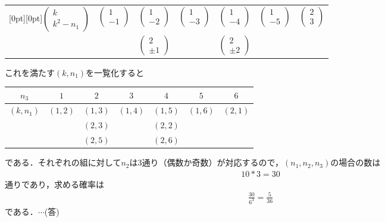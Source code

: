\documentclass[a4paper,10pt]{ltjsarticle}
\begin{document}
\begin{multicols}{2}
\begin{table}[H]
\begin{tabular}{|c||c|c|c|c|c|c|}
      \raisebox{-1.5ex}[0pt][0pt]{$\begin{pmatrix} k \\ k^2-n_1 \end{pmatrix}$} & $\begin{pmatrix} 1 \\ -1 \end{pmatrix}$ & $\begin{pmatrix} 1 \\ -2 \end{pmatrix}$    & $\begin{pmatrix} 1 \\ -3 \end{pmatrix}$ & $\begin{pmatrix} 1 \\ -4 \end{pmatrix}$    & $\begin{pmatrix} 1 \\ -5 \end{pmatrix}$ & $\begin{pmatrix} 2 \\  3 \end{pmatrix}$ \\
                                                                                &                                         & $\begin{pmatrix} 2 \\ \pm 1 \end{pmatrix}$ &                                         & $\begin{pmatrix} 2 \\ \pm 2 \end{pmatrix}$ &                                         &                                         \\
      \hline
    \end{tabular}
  \end{table}
  これを満たす$(k,n_1)$を一覧化すると
  \begin{table}[H]
    \begin{tabular}{|c||c|c|c|c|c|c|}
      \hline
      $n_3$      & $1$     & $2$     & $3$     & $4$     & $5$     & $6$     \\
      \hline
      $(k, n_1)$ & $(1,2)$ & $(1,3)$ & $(1,4)$ & $(1,5)$ & $(1,6)$ & $(2,1)$ \\
                 &         & $(2,3)$ &         & $(2,2)$ &         &         \\
                 &         & $(2,5)$ &         & $(2,6)$ &         &         \\
      \hline
    \end{tabular}
  \end{table}
  である．それぞれの組に対して$n_2$は3通り（偶数か奇数）が対応するので，$(n_1,n_2,n_3)$の場合の数は
  \begin{align*}
    10*3 = 30
  \end{align*}
  通りであり，求める確率は
  \begin{align*}
    \frac{30}{6^3} = \frac{5}{36}
  \end{align*}
  である．$\cdots$(答)


\end{multicols}
\end{document}
